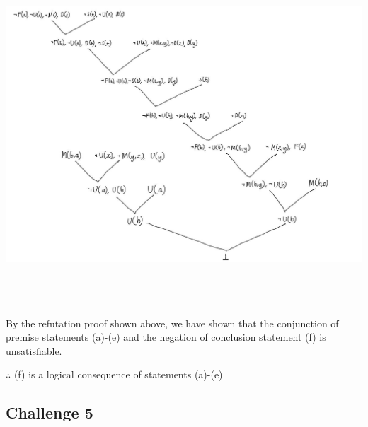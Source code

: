 \documentclass[12pt]{article}
\begin{document}
\begin{center}
\includegraphics[width=6in,height=5in,keepaspectratio]{q4_refutation.jpg}
\end{center}

\bigskip
\noindent
By the refutation proof shown above, we have shown that the conjunction of
premise statements (a)-(e) and the negation of conclusion statement (f) is
unsatisfiable. 

\bigskip
\noindent
$\therefore$ (f) is a logical consequence of statements (a)-(e)



\subsection*{Challenge 5}
\end{document}
